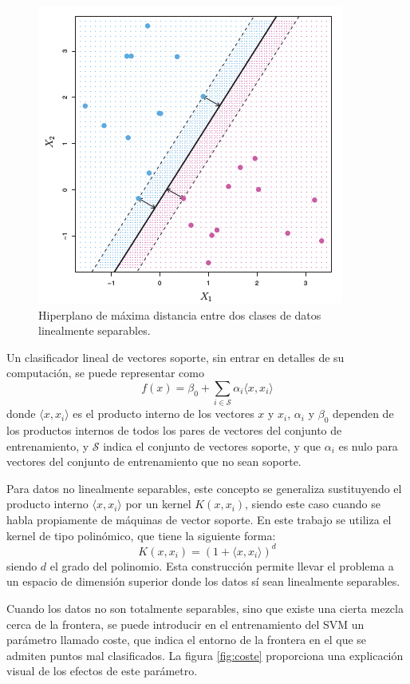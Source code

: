 \documentclass[12pt]{scrartcl}
\begin{document}
\begin{figure}[h]
\centering
\includegraphics [width=8 cm]{svmlinear}
\caption{Hiperplano de máxima distancia entre dos clases de datos linealmente separables.}
\label{fig:svmlineal}
\end{figure}

Un clasificador lineal de vectores soporte, sin entrar en detalles de su computación, se puede representar como
\begin{equation}
f(x) = \beta_0 + \sum_{i \in \mathcal{S}} \alpha_i \langle x,x_i \rangle
\end{equation}
donde $\langle x,x_i \rangle$ es el producto interno de los vectores $x$ y $x_i$, $\alpha_i$ y $\beta_0$ dependen de los productos internos de todos los pares de vectores del conjunto de entrenamiento, y $\mathcal{S}$ indica el conjunto de vectores soporte, y que $\alpha_i$ es nulo para vectores del conjunto de entrenamiento que no sean soporte.\par
Para datos no linealmente separables, este concepto se generaliza sustituyendo el producto interno $\langle x,x_i \rangle$ por un kernel $K(x,x_i)$, siendo este caso cuando se habla propiamente de máquinas de vector soporte. En este trabajo se utiliza el kernel de tipo polinómico, que tiene la siguiente forma:
\begin{equation}
K(x,x_i)=\left(1+\langle x,x_i \rangle \right)^d
\end{equation}
siendo $d$ el grado del polinomio. Esta construcción permite llevar el problema a un espacio de dimensión superior donde los datos sí sean linealmente separables.\par

Cuando los datos no son totalmente separables, sino que existe una cierta mezcla cerca de la frontera, se puede introducir en el entrenamiento del SVM un parámetro llamado coste, que indica el entorno de la frontera en el que se admiten puntos mal clasificados. La figura \ref{fig:coste} proporciona una explicación visual de los efectos de este parámetro.\par
\end{document}
